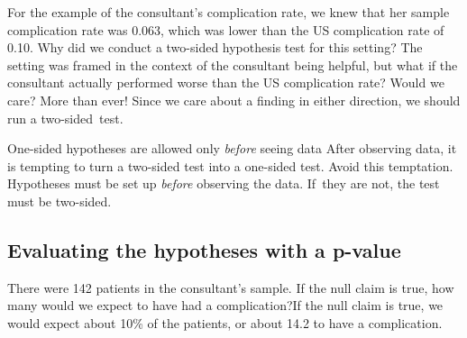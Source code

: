 \D{\newpage}

\begin{examplewrap}
\begin{nexample}{For the example of the consultant's complication rate, we knew that her sample complication rate was 0.063, which was lower than the US complication rate of 0.10. Why did we conduct a two-sided hypothesis test for this setting?}
The setting was framed in the context of the consultant being helpful, but what if the consultant actually performed worse than the US complication rate? Would we care? More than ever! Since we care about a finding in either direction, we should run a two-sided~test.
\end{nexample}
\end{examplewrap}

\begin{onebox}{One-sided hypotheses are allowed only \emph{before} seeing data}
{After observing data, it is tempting to turn a two-sided test into a one-sided test. Avoid this temptation. Hypotheses must be set up \emph{before} observing the data. If~they are not, the test must be two-sided.}
\end{onebox}


\subsection{Evaluating the hypotheses with a p-value}

\begin{examplewrap}
\begin{nexample}
{There were 142 patients in the consultant's sample. If the null claim is true, how many would we expect to have had a complication?}If the null claim is true, we would expect about 10\% of the patients, or about 14.2 to have a complication.
\end{nexample}
\end{examplewrap}

